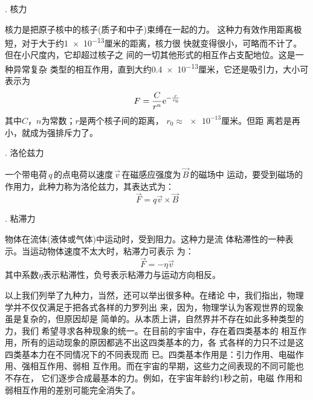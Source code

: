 . 核力 \normalfont

核力是把原子核中的核子(质子和中子)束缚在一起的力。
这种力有效作用距离极短，对于大于约\num{1e-13}厘米的距离，核力很
快就变得很小，可略而不计了。但在小尺度内，它却超过核子之
间的一切其他形式的相互作占支配地位。这是一种异常复杂
类型的相互作用，直到大约\num{0.4e-13}厘米，它还是吸引力，大小可表示为
\begin{equation}\label{eqn:03.04.06}
    F = \frac { C } { r ^ { n } } {\rm e} ^ { - \frac { r } { r_0 } }
\end{equation}
其中$ C $，$ n $为常数；$ r $是两个核子间的距离， $ r _ { 0 } \approx \num{e-13} $厘米。但距
离若是再小，就成为强排斥力了。

. 洛伦兹力 \normalfont

一个带电荷\,$ q $\,的点电荷以速度\,$\vec{v}$\,在磁感应强度为\,$\vec{B}$\,的磁场中
运动，要受到磁场的作用力，此种力称为洛伦兹力，其表达式为：
\begin{equation}\label{eqn:03.04.07}
    \vec{F} = q \vec{v} \times \vec{B}
\end{equation}

. 粘滞力 \normalfont

物体在流体(液体或气体)中运动时，受到阻力。这种力是流
体粘滞性的一种表示。当运动物体速度不太大时，粘滞力可表示
为：\vspace{-1em}
\begin{equation}\label{eqn:03.04.08}
    \vec{F} = - \eta \vec{v}
\end{equation}
其中系数$\eta$表示粘滞性，负号表示粘滞力与运动方向相反。

以上我们列举了九种力，当然，还可以举出很多种。在绪论
中，我们指出，物理学并不仅仅满足于把各式各样的力罗列出
来，因为，物理学认为客观世界的现象虽是复杂的，但原因却是
简单的。从本质上讲，自然界并不存在如此多种类型的力，我们
希望寻求各种现象的统一。在目前的宇宙中，存在着四类基本的
相互作用，所有的运动现象的原因都逃不出这四类基本的力，各
式各样的力只不过是这四类基本力在不同情况下的不同表现而
已。四类基本作用是：引力作用、电磁作用、强相互作用、弱相
互作用。而在宇宙的早期，这些力之间表现的不同可能也不存在，
它们逐步合成最基本的力。例如，在宇宙年龄约1秒之前，电磁
作用和弱相互作用的差别可能完全消失了。



